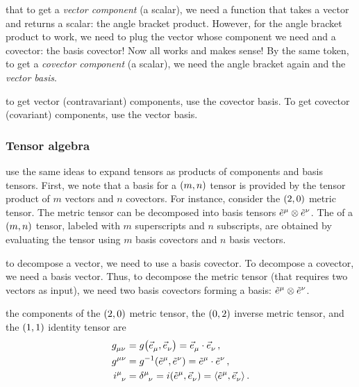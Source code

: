  that to get a \emph{vector component} (a scalar), we need a function that takes a vector and returns a scalar: the angle bracket product. However, for the angle bracket product to work, we need to plug the vector whose component we need and a covector: the basis covector! Now all works and makes sense! By the same token, to get a \emph{covector component} (a scalar), we need the angle bracket again and the \emph{vector basis}.

 to get vector (contravariant) components, use the covector basis. To get covector (covariant) components, use the vector basis.


\subsubsection{Tensor algebra}
%
 use the same ideas to expand tensors as products of components and basis tensors. First, we note that a basis for a $\torder mn$ tensor is provided by the tensor product of $m$ vectors and $n$ covectors. For instance, consider the $\torder 20$ metric tensor. The metric tensor can be decomposed into basis tensors $\tbcov\mu\tprod\tbcov\nu$. The  of a $\torder mn$ tensor, labeled with $m$ superscripts and $n$ subscripts, are obtained by evaluating the tensor using $m$ basis covectors and $n$ basis vectors.

 to decompose a vector, we need to use a basis covector. To decompose a covector, we need a basis vector. Thus, to decompose the metric tensor (that requires two vectors as input), we need two basis covectors forming a basis: $\tbcov\mu\tprod\tbcov\nu$.

 the components of the $\torder 20$ metric tensor, the $\torder 02$ inverse metric tensor, and the $\torder 11$ identity tensor are
%
\begin{align}\label{eq:metricinversemetricidentitytensorscomponents}
  \tmetric\mu\nu &= \metric\vat{\tbvec\mu, \tbvec\nu} = \tbvec\mu\iprod\tbvec\nu \,,\\\nonumber
  \tinvmet\mu\nu &= \invmet\vat{\tbcov\mu, \tbcov\nu} = \tbcov\mu\iprod\tbcov\nu \,,\\\nonumber
  \tidtens\mu\nu &= \tkron\mu\nu = \idtens\vat{\tbcov\mu, \tbvec\nu} = \sprod{\tbcov\mu}{\tbvec\nu} \,.\\\nonumber
\end{align}


